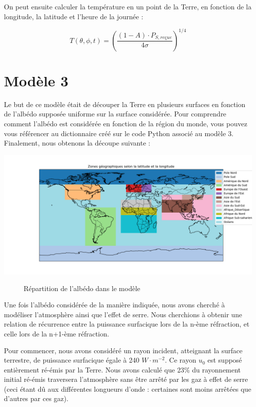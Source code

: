 \documentclass[a4paper,11pt]{article}
\begin{document}
On peut ensuite calculer la température en un point de la Terre, en fonction de la longitude, la latitude et l'heure de la journée :

\[ T (\theta , \phi , t) = \left(\dfrac{(1 - A) \cdot P_{S,reçue}}{4\sigma}\right)^{1/4} \]

\section{Modèle 3}

Le but de ce modèle était de découper la Terre en plusieurs surfaces en fonction de l'albédo supposée uniforme sur la surface considérée. Pour comprendre comment l'albédo est considérée en fonction de la région du monde, vous pouvez vous référencer au dictionnaire créé sur le code Python associé au modèle 3. Finalement, nous obtenons la découpe suivante :

\begin{adjustbox}{center}
\includegraphics[scale=0.5]{Schema_albedo}
\end{adjustbox}
\begin{figure}[h]
  \centering
  \caption{Répartition de l'albédo dans le modèle}
\end{figure}

Une fois l'albédo considérée de la manière indiquée, nous avons cherché à modéliser l'atmosphère ainsi que l'effet de serre. Nous cherchions à obtenir une relation de récurrence entre la puissance surfacique lors de la n-ème réfraction, et celle lors de la n+1-ème réfraction.

Pour commencer, nous avons considéré un rayon incident, atteignant la surface terrestre, de puissance surfacique égale à 240 $W \cdot m^{-2}$. Ce rayon $u_0$ est supposé entièrement ré-émis par la Terre. Nous avons calculé que 23\% du rayonnement initial ré-émis traversera l'atmosphère sans être arrêté par les gaz à effet de serre (ceci étant dû aux différentes longueurs d'onde : certaines sont moins arrêtées que d'autres par ces gaz).
 
\end{document}
